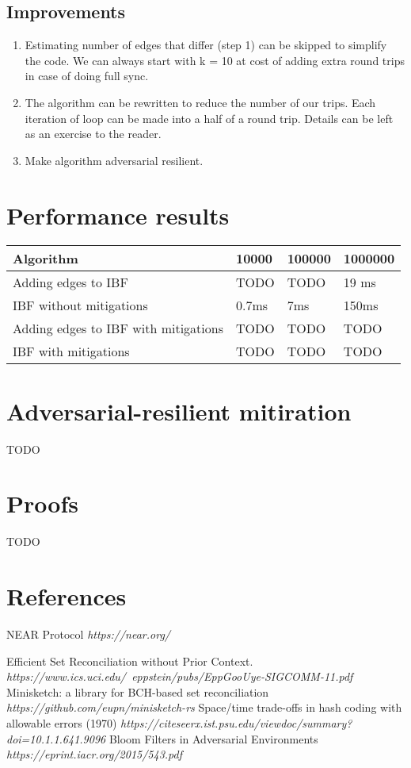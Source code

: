 \documentclass[11pt]{article}
\begin{document}
\subsection{Improvements}
\begin{enumerate}
\item Estimating number of edges that differ (step 1) can be skipped to simplify the code. We can always start with k = 10 at cost of adding extra round trips in case of doing full sync.
\item The algorithm can be rewritten to reduce the number of our trips. Each iteration of loop can be made into a half of a round trip.
Details can be left as an exercise to the reader.
\item Make algorithm adversarial resilient.
\end{enumerate}


\section{Performance results}

\begin{tabular}{ | l | l | l | l |}
    \hline
    Algorithm & 10000 & 100000 & 1000000 \\ \hline
    Adding edges to IBF & TODO & TODO & 19 ms \\
    IBF without mitigations & 0.7ms & 7ms & 150ms  \\   \hline
    Adding edges to IBF with mitigations & TODO & TODO & TODO \\
    IBF with mitigations & TODO & TODO & TODO \\ \hline
    \end{tabular}

\section{Adversarial-resilient mitiration}\label{sec:mitigation}
TODO

\section{Proofs}
TODO

\section{References}

\begin{thebibliography}{9}
NEAR Protocol
\textit{https://near.org/}

Efficient Set Reconciliation without Prior Context.
\textit{https://www.ics.uci.edu/~eppstein/pubs/EppGooUye-SIGCOMM-11.pdf}
Minisketch: a library for BCH-based set reconciliation
\textit{https://github.com/eupn/minisketch-rs}
Space/time trade-offs in hash coding with allowable errors (1970)
\textit{https://citeseerx.ist.psu.edu/viewdoc/summary?doi=10.1.1.641.9096}
Bloom Filters in Adversarial Environments
\textit{https://eprint.iacr.org/2015/543.pdf}
\end{thebibliography}
\end{document}
